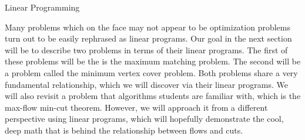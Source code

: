 \begin{section}{Linear Programming}
\end{section}
	Many problems which on the face may not appear to be optimization problems turn out to be 
	easily rephrased as linear programs. Our goal in the next section will be to describe two 
	problems in terms of their linear programs. The first of these problems will be the is the 
	maximum matching problem. The second will be a problem called the minimum vertex 
	cover problem. Both problems share a very fundamental relationship, which we will discover 
	via their linear programs. We will also revisit a problem that algorithms students are familiar
	with, which is the max-flow min-cut theorem. However, we will approach it from a different 
	perspective using linear programs, which will hopefully demonstrate the cool, deep math 
	that is behind the relationship between flows and cuts.

